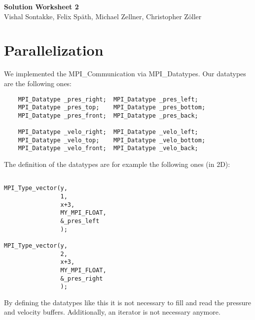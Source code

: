 \documentclass[a4paper]{article}
\begin{document}
\begin{center}
	\huge\textbf{Solution Worksheet 2}\\
	\bigskip
	\normalsize Vishal Sontakke, Felix Späth, Michael Zellner, Christopher Zöller
	
\end{center}


\section{Parallelization}

We implemented the MPI\_Communication via MPI\_Datatypes. Our datatypes are the following ones:

\begin{lstlisting}
	MPI_Datatype _pres_right;  MPI_Datatype _pres_left;
	MPI_Datatype _pres_top;    MPI_Datatype _pres_bottom;
	MPI_Datatype _pres_front;  MPI_Datatype _pres_back;
	
	MPI_Datatype _velo_right;  MPI_Datatype _velo_left;
	MPI_Datatype _velo_top;    MPI_Datatype _velo_bottom;
	MPI_Datatype _velo_front;  MPI_Datatype _velo_back;
\end{lstlisting}

The definition of the datatypes are for example the following ones (in 2D):
\begin{lstlisting}

MPI_Type_vector(y, 
				1, 
				x+3, 
				MY_MPI_FLOAT,
				&_pres_left
				);

MPI_Type_vector(y,
				2, 
				x+3, 
				MY_MPI_FLOAT,	
				&_pres_right
				);
\end{lstlisting}

By defining the datatypes like this it is not necessary to fill and read the pressure and velocity buffers. Additionally, an iterator is not necessary anymore.
\end{document}
